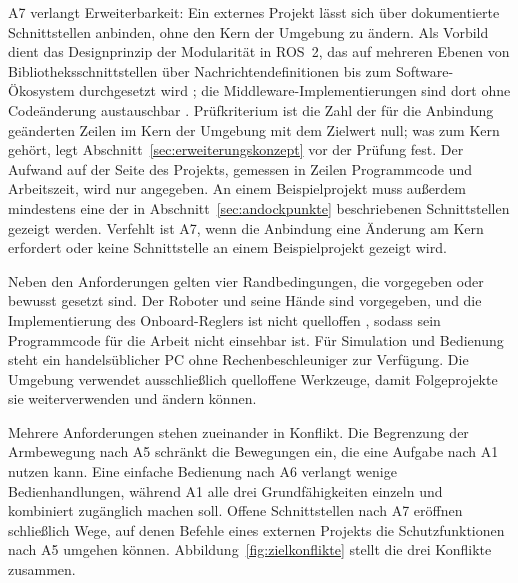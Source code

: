 A7 verlangt Erweiterbarkeit: Ein externes Projekt lässt sich über dokumentierte Schnittstellen anbinden, ohne den Kern der Umgebung zu ändern.
Als Vorbild dient das Designprinzip der Modularität in ROS~2, das auf mehreren Ebenen von Bibliotheksschnittstellen über Nachrichtendefinitionen bis zum Software-Ökosystem durchgesetzt wird \cite{Macenski2022}; die Middleware-Implementierungen sind dort ohne Codeänderung austauschbar \cite{Macenski2022}.
Prüfkriterium ist die Zahl der für die Anbindung geänderten Zeilen im Kern der Umgebung mit dem Zielwert null; was zum Kern gehört, legt Abschnitt~\ref{sec:erweiterungskonzept} vor der Prüfung fest. %
Der Aufwand auf der Seite des Projekts, gemessen in Zeilen Programmcode und Arbeitszeit, wird nur angegeben. %
An einem Beispielprojekt muss außerdem mindestens eine der in Abschnitt~\ref{sec:andockpunkte} beschriebenen Schnittstellen gezeigt werden. %
Verfehlt ist A7, wenn die Anbindung eine Änderung am Kern erfordert oder keine Schnittstelle an einem Beispielprojekt gezeigt wird.

Neben den Anforderungen gelten vier Randbedingungen, die vorgegeben oder bewusst gesetzt sind.
Der Roboter und seine Hände sind vorgegeben, und die Implementierung des Onboard-Reglers ist nicht quelloffen \cite{Hu2026}, sodass sein Programmcode für die Arbeit nicht einsehbar ist.
Für Simulation und Bedienung steht ein handelsüblicher PC ohne Rechenbeschleuniger zur Verfügung.
Die Umgebung verwendet ausschließlich quelloffene Werkzeuge, damit Folgeprojekte sie weiterverwenden und ändern können.

Mehrere Anforderungen stehen zueinander in Konflikt.
Die Begrenzung der Armbewegung nach A5 schränkt die Bewegungen ein, die eine Aufgabe nach A1 nutzen kann.
Eine einfache Bedienung nach A6 verlangt wenige Bedienhandlungen, während A1 alle drei Grundfähigkeiten einzeln und kombiniert zugänglich machen soll.
Offene Schnittstellen nach A7 eröffnen schließlich Wege, auf denen Befehle eines externen Projekts die Schutzfunktionen nach A5 umgehen können.
Abbildung~\ref{fig:zielkonflikte} stellt die drei Konflikte zusammen.

